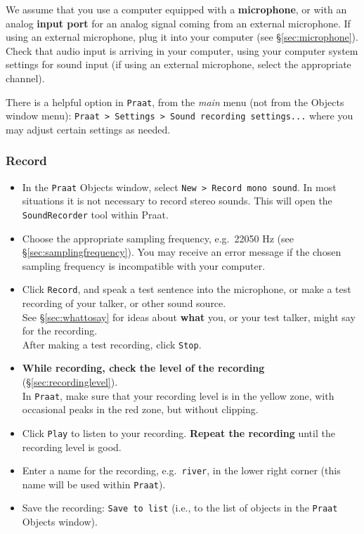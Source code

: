 \documentclass[
]{book}
\begin{document}
We assume that you use a computer equipped with a \textbf{microphone}, or with an analog \textbf{input port} for an analog signal coming from an external microphone. If using an external microphone, plug it into your computer (see §\ref{sec:microphone}). Check that audio input is arriving in your computer, using your computer system settings for sound input (if using an external microphone, select the appropriate channel).

There is a helpful option in \texttt{Praat}, from the \emph{main} menu (not from the Objects window menu): \texttt{Praat\ \textgreater{}\ Settings\ \textgreater{}\ Sound\ recording\ settings...} where you may adjust certain settings as needed.

\label{box-praatrecord}
\subsubsection{Record}\label{sec:praatrecord}

\begin{itemize}
\item
  In the \texttt{Praat} Objects window, select \texttt{New\ \textgreater{}\ Record\ mono\ sound}.
  In most situations it is not necessary to record stereo sounds. This will open the \texttt{SoundRecorder} tool within Praat.
\item
  Choose the appropriate sampling frequency, e.g.~22050 Hz (see §\ref{sec:samplingfrequency}). You may receive an error message if the chosen sampling frequency is incompatible with your computer.
\item
  Click \texttt{Record}, and speak a test sentence into the microphone, or make a test recording of your talker, or other sound source.\\
  See §\ref{sec:whattosay} for ideas about \textbf{what} you, or your test talker, might say for the recording.\\
  After making a test recording, click \texttt{Stop}.
\item
  \textbf{While recording, check the level of the recording} (§\ref{sec:recordinglevel}).\\
  In \texttt{Praat}, make sure that your recording level is in the yellow zone, with occasional peaks in the red zone, but without clipping.
\item
  Click \texttt{Play} to listen to your recording. \textbf{Repeat the recording} until the recording level is good.
\item
  Enter a name for the recording, e.g.~\texttt{river}, in the lower right corner (this name will be used within \texttt{Praat}).
\item
  Save the recording: \texttt{Save\ to\ list} (i.e., to the list of objects in the \texttt{Praat} Objects window).
\end{itemize}
\end{document}
